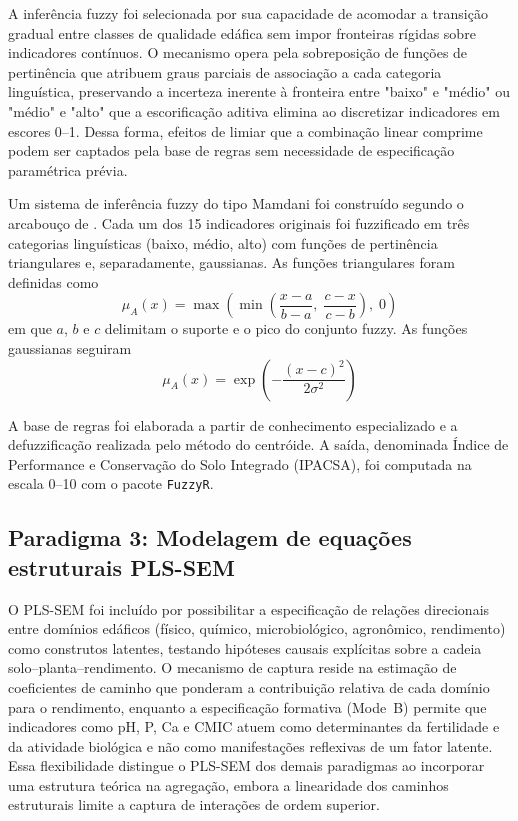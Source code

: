 \documentclass[pdflatex,sn-basic]{sn-jnl}%
\begin{document}
A inferência fuzzy foi selecionada por sua capacidade de acomodar a transição gradual entre classes de qualidade edáfica sem impor fronteiras rígidas sobre indicadores contínuos. O mecanismo opera pela sobreposição de funções de pertinência que atribuem graus parciais de associação a cada categoria linguística, preservando a incerteza inerente à fronteira entre "baixo" e "médio" ou "médio" e "alto" que a escorificação aditiva elimina ao discretizar indicadores em escores 0--1. Dessa forma, efeitos de limiar que a combinação linear comprime podem ser captados pela base de regras sem necessidade de especificação paramétrica prévia.

Um sistema de inferência fuzzy do tipo Mamdani \citep{Mamdani1975} foi construído segundo o arcabouço de \cite{Torbert2008}. Cada um dos 15 indicadores originais foi fuzzificado em três categorias linguísticas (baixo, médio, alto) com funções de pertinência triangulares e, separadamente, gaussianas. As funções triangulares foram definidas como
\begin{equation}
\mu_A(x) = \max\left(\min\left(\frac{x-a}{b-a},\; \frac{c-x}{c-b}\right),\; 0\right)
\label{eq:trimf}
\end{equation}
em que $a$, $b$ e $c$ delimitam o suporte e o pico do conjunto fuzzy. As funções gaussianas seguiram
\begin{equation}
\mu_A(x) = \exp\left(-\frac{(x-c)^2}{2\sigma^2}\right)
\label{eq:gaussmf}
\end{equation}

A base de regras foi elaborada a partir de conhecimento especializado e a defuzzificação realizada pelo método do centróide. A saída, denominada Índice de Performance e Conservação do Solo Integrado (IPACSA), foi computada na escala 0--10 com o pacote \texttt{FuzzyR}.

\subsection{Paradigma 3: Modelagem de equações estruturais PLS-SEM}\label{subsec:sem}

O PLS-SEM foi incluído por possibilitar a especificação de relações direcionais entre domínios edáficos (físico, químico, microbiológico, agronômico, rendimento) como construtos latentes, testando hipóteses causais explícitas sobre a cadeia solo--planta--rendimento. O mecanismo de captura reside na estimação de coeficientes de caminho que ponderam a contribuição relativa de cada domínio para o rendimento, enquanto a especificação formativa (Mode~B) permite que indicadores como pH, P, Ca e CMIC atuem como determinantes da fertilidade e da atividade biológica e não como manifestações reflexivas de um fator latente. Essa flexibilidade distingue o PLS-SEM dos demais paradigmas ao incorporar uma estrutura teórica na agregação, embora a linearidade dos caminhos estruturais limite a captura de interações de ordem superior.
\end{document}
